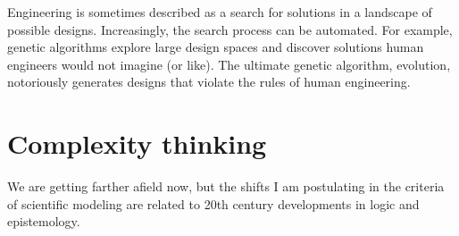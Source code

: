 \documentclass[12pt]{book}
\theoremstyle{exercise}
\newcommand{\myrightarrow}{\ensuremath \rightarrow}
\begin{document}
\begin{description}

\item[Design \myrightarrow~search] Engineering is sometimes described
  as a search for solutions in a landscape of possible designs.
  Increasingly, the search process can be automated.  For example,
  genetic algorithms explore large design spaces and discover
  solutions human engineers would not imagine (or like).  The ultimate
  genetic algorithm, evolution, notoriously generates designs that
  violate the rules of human engineering.


\end{description}


\section{Complexity thinking}

We are getting farther afield now, but the shifts I am postulating
in the criteria of scientific modeling are related to 20th century
developments in logic and epistemology.

\end{document}
